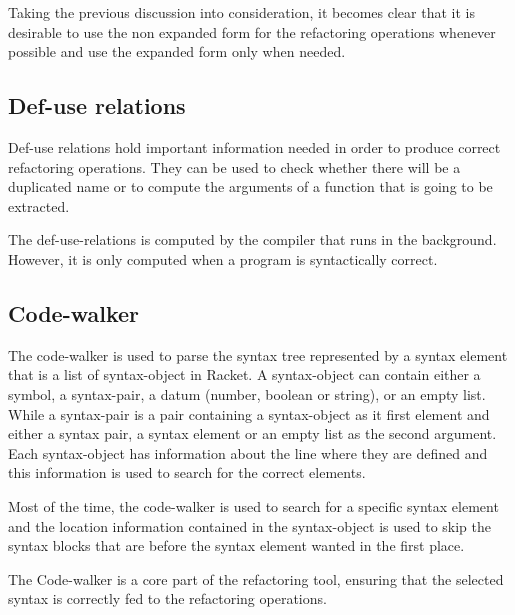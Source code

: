 Taking the previous discussion into consideration, it becomes clear
that it is desirable to use the non expanded form for the
refactoring %
operations whenever possible and use the expanded form only when
needed.%


\subsection{Def-use relations}
Def-use relations hold important information needed in order to
produce correct refactoring operations.  They can be used to check
whether there will be a duplicated name or to compute the arguments of
a function that is going to be extracted.

The def-use-relations is computed by the %
compiler that runs in the background.  However, it is only computed
when a program is syntactically correct.

\subsection{Code-walker}
The code-walker is used to parse the syntax tree represented by a
syntax element that is a list of syntax-object in Racket.  A
syntax-object can contain either a symbol, a syntax-pair, a datum
(number, boolean or string), or an empty list.  While a syntax-pair is
a pair containing a syntax-object as it first element and either a
syntax pair, a syntax element or an empty list as the second argument.
Each syntax-object has information about the line where they are
defined and this information is used to search for the correct
elements.


Most of the time, the code-walker is used to search for a specific
syntax element and the location information contained in the
syntax-object is used to skip the syntax blocks that are before the
syntax element wanted in the first place.

The Code-walker is a core part of the refactoring tool, ensuring that
the selected syntax is correctly fed to the refactoring
operations. %


